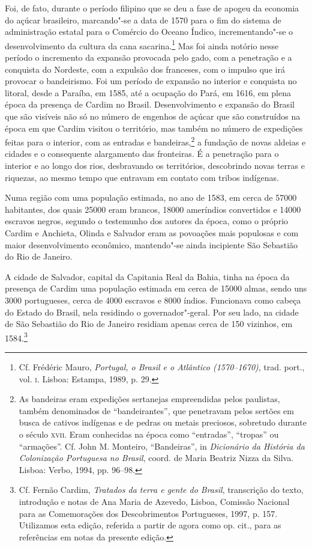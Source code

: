 Foi, de fato, durante o período filipino que se deu a fase de
apogeu da economia do açúcar brasileiro, marcando"-se a data de 1570
para o fim do sistema de administração estatal para o Comércio do
Oceano Índico, incrementando"-se o desenvolvimento da cultura da cana
sacarina.\footnote{ Cf. Frédéric Mauro, \textit{Portugal, o
Brasil e o Atlântico (1570--1670)}, trad. port., vol. \textsc{i}. Lisboa:
Estampa, 1989, p. 29.} Mas foi ainda notório nesse período o
incremento da expansão provocada pelo gado, com a penetração e a
conquista do Nordeste, com a expulsão dos franceses, com o impulso que
irá provocar o bandeirismo. Foi um período de expansão no interior e
conquista no litoral, desde a Paraíba, em 1585, até a ocupação do Pará,
em 1616, em plena época da presença de Cardim no Brasil. 
Desenvolvimento e expansão do Brasil que são visíveis não só no número
de engenhos de açúcar que são construídos na época em que Cardim
visitou o território, mas também no número de expedições feitas para o
interior, com as entradas e bandeiras,\footnote{ As bandeiras eram
expedições sertanejas empreendidas pelos paulistas, também denominados
de ``bandeirantes'', que penetravam pelos sertões em busca de cativos
indígenas e de pedras ou metais preciosos, sobretudo durante o século
\textsc{xvii}. Eram conhecidas na época como ``entradas'', ``tropas'' ou ``armações''.
Cf. John M. Monteiro, ``Bandeiras'', in \textit{Dicionário da História
da Colonização Portuguesa no Brasil}, coord. de Maria Beatriz Nizza da
Silva. Lisboa: Verbo, 1994, pp. 96--98.} a fundação de novas aldeias e
cidades e o consequente alargamento das fronteiras. É a penetração para
o interior e ao longo dos rios, desbravando os territórios, descobrindo
novas terras e riquezas, ao mesmo tempo que entravam em contato com tribos indígenas. 

Numa região com uma população estimada, no ano de 1583, em cerca de
57000 habitantes, dos quais 25000 eram brancos, 18000 ameríndios
convertidos e 14000 escravos negros, segundo o testemunho dos autores
da época, como o próprio Cardim e Anchieta, Olinda e Salvador eram as
povoações mais populosas e com maior desenvolvimento econômico,
mantendo"-se ainda incipiente São Sebastião do Rio de Janeiro.

A cidade de Salvador, capital da Capitania Real da Bahia, tinha na
época da presença de Cardim uma população estimada em cerca de 15000
almas, sendo uns 3000 portugueses, cerca de 4000 escravos e 8000
índios. Funcionava como cabeça do Estado do Brasil, nela residindo o
governador"-geral. Por seu lado, na cidade de São Sebastião do Rio de
Janeiro residiam apenas cerca de 150 vizinhos, em 1584.\footnote{ Cf. Fernão Cardim, 
\textit{Tratados da terra e gente do Brasil}, transcrição do texto, introdução e notas de 
Ana Maria de Azevedo, Lisboa, Comissão Nacional para as Comemorações dos Descobrimentos Portugueses, 
1997, p. 157. Utilizamos esta edição, referida a partir de agora como op. cit., 
para as referências em notas da presente edição.}

